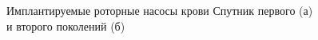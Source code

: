 \begin{figure}[ht]
  \begin{minipage}[ht]{0.48\linewidth}
  \end{minipage}
  \hfill
  \begin{minipage}[ht]{0.48\linewidth}
  \end{minipage}
  \caption{Имплантируемые роторные насосы крови Спутник первого (а) \\и второго поколений (б)}
  \label{img:sputnik_pumps}  
\end{figure}


